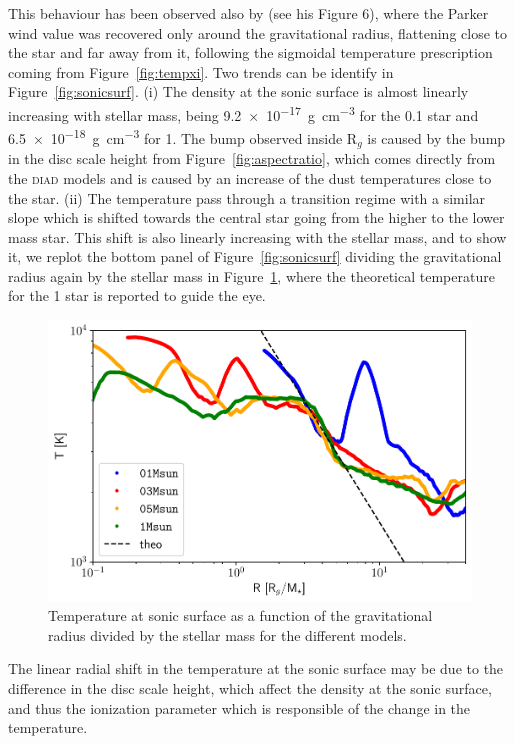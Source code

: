 \documentclass[usenatbib,useAMS,usedcolumn]{mnras}
\begin{document}
This behaviour has been observed also by  (see his Figure 6), where the Parker wind value was recovered only around the gravitational radius, flattening close to the star and far away from it, following the sigmoidal temperature prescription coming from Figure~\ref{fig:tempxi}.
Two trends can be identify in Figure~\ref{fig:sonicsurf}.
(i) The density at the sonic surface is almost linearly increasing with stellar mass, being \SI{9.2e-17}{g.cm^{-3}} for the \SI{0.1}{\solarmass} star and \SI{6.5e-18}{g.cm^{-3}} for \SI{1}{\solarmass}. The bump observed inside $\mathrm{R}_g$ is caused by the bump in the disc scale height from Figure~\ref{fig:aspectratio}, which comes directly from the \textsc{diad} models and is caused by an increase of the dust temperatures close to the star.
(ii) The temperature pass through a transition regime with a similar slope which is shifted towards the central star going from the higher to the lower mass star. This shift is also linearly increasing with the stellar mass, and to show it, we replot the bottom panel of Figure~\ref{fig:sonicsurf} dividing the gravitational radius again by the stellar mass in Figure~\ref{fig:sonicsurfrescaled}, where the theoretical temperature for the \SI{1}{\solarmass} star is reported to guide the eye.
\begin{figure}
    \centering
    \includegraphics[width=\columnwidth]{Figure10}
    \caption{Temperature at sonic surface as a function of the gravitational radius divided by the stellar mass for the different models. \label{fig:sonicsurfrescaled}}
\end{figure}
The linear radial shift in the temperature at the sonic surface may be due to the difference in the disc scale height, which affect the density at the sonic surface, and thus the ionization parameter which is responsible of the change in the temperature. 
\end{document}
